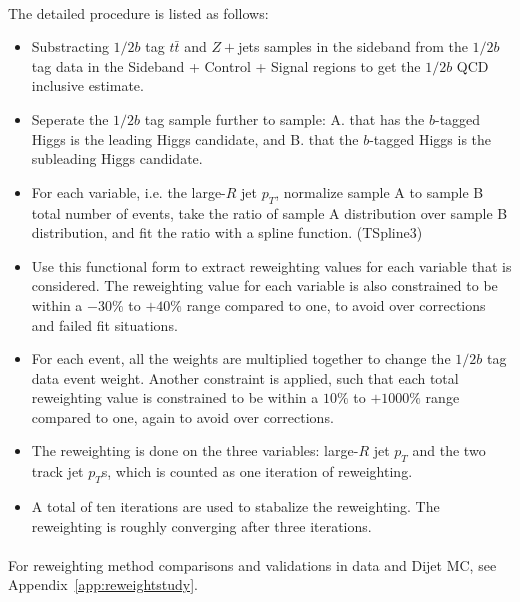 \paragraph{}
The detailed procedure is listed as follows:
\begin{itemize}
\item Substracting $1/2b$ tag $t\bar{t}$ and $Z+$jets samples in the sideband from the $1/2b$ tag data in the Sideband + Control + Signal regions to get the $1/2b$ QCD inclusive estimate.
\item Seperate the $1/2b$ tag sample further to sample: A. that has the $b$-tagged Higgs is the leading \pt Higgs candidate, and B. that the $b$-tagged Higgs is the subleading \pt Higgs candidate.
\item For each variable, i.e. the large-$R$ jet $p_{T}$, normalize sample A to sample B total number of events, take the ratio of sample A distribution over sample B distribution, and fit the ratio with a spline function. (TSpline3)
\item Use this functional form to extract reweighting values for each variable that is considered. The reweighting value for each variable is also constrained to be within a $-30\%$ to $+40\%$ range compared to one, to avoid over corrections and failed fit situations. 
\item For each event, all the weights are multiplied together to change the $1/2b$ tag data event weight. Another constraint is applied, such that each total reweighting value is constrained to be within a $10\%$ to $+1000\%$ range compared to one, again to avoid over corrections.
\item The reweighting is done on the three variables: large-$R$ jet $p_{T}$ and the two track jet $p_{T}$s, which is counted as one iteration of reweighting.
\item A total of ten iterations are used to stabalize the reweighting. The reweighting is roughly converging after three iterations.
\end{itemize}

\paragraph{}
For reweighting method comparisons and validations in data and Dijet MC, see Appendix~\ref{app:reweightstudy}.

